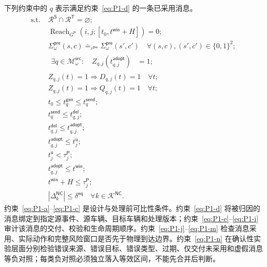 \documentclass[10pt,a4paper,twocolumn]{article}
\begin{document}
\addtocounter{equation}{-1}
下列约束中的 $q$ 表示满足约束~\eqref{eq:P1-d} 的一条已采用消息。
\begin{subequations}
\begin{align}
\mathrm{s.t.}\;&\mathcal R^{\mathsf S}\cap\mathcal R^{\mathsf T}=\varnothing;
\label{eq:P1-a}\\
&\operatorname{Reach}_{G^{\mathsf P}}\!(i,j;[t_0,t^{\mathsf{win}}+H])=0;
\label{eq:P1-b}\\
&\Sigma_{\omega}^{\mathsf{pre}}(s,c)\doteq_{\varepsilon^{\mathsf{pre}}}
\Sigma_{\omega}^{\mathsf{pre}}(s',c')
\quad\forall(s,c),(s',c')\in\{0,1\}^{2};
\label{eq:P1-c}\\
&\begin{aligned}
\exists q\in\mathcal M_{\omega}^{\mathsf{src}}:\quad
Z_{q,j}(t_{q,j}^{\mathsf{adopt}})&=1;
\end{aligned}
\label{eq:P1-d}\\
&Z_{q,j}(t)=1\Rightarrow D_{q,j}(t)=1\quad\forall t;
\label{eq:P1-e}\\
&Z_{q,j}(t)=1\Rightarrow Q_{q,j}(t)=1\quad\forall t;
\label{eq:P1-f}\\
&t_0\leq t_q^{\mathsf{gen}}\leq t_q^{\mathsf{send}};
\label{eq:P1-g}\\
&t_q^{\mathsf{send}}\leq t_{q,j}^{\mathsf{del}};
\label{eq:P1-h}\\
&t_{q,j}^{\mathsf{del}}\leq t_{q,j}^{\mathsf{adopt}};
\label{eq:P1-i}\\
&t_{q,j}^{\mathsf{adopt}}\leq t_j^{\mathsf u};
\label{eq:P1-j}\\
&t_j^{\mathsf u}<\tau_j^{\mathsf P};
\label{eq:P1-k}\\
&t_{q,j}^{\mathsf{adopt}}\leq t^{\mathsf{win}};
\label{eq:P1-l}\\
&t^{\mathsf{win}}+H\leq\tau_j^{\mathsf P};
\label{eq:P1-m}\\
&\left|\Delta_{k}^{\mathsf{NC}}\right|\leq\delta^{\mathsf{eq}}
\quad\forall k\in\mathcal K^{\mathsf{NC}}.
\label{eq:P1-n}
\end{align}
\end{subequations}
约束~\eqref{eq:P1-a}--\eqref{eq:P1-c} 是设计与处理前可比性条件。约束~\eqref{eq:P1-d} 将被归因的消息绑定到指定源事件、源车辆、目标车辆和处理版本；约束~\eqref{eq:P1-e}--\eqref{eq:P1-i} 审计该消息的交付、校验和生命周期顺序。约束~\eqref{eq:P1-j}--\eqref{eq:P1-m} 检查消息采用、实际动作和完整风险窗口是否先于物理到达边界。约束~\eqref{eq:P1-n} 在确认性实验层面分别检验错误来源、错误目标、错误类型、过期、仅交付未采用和虚假消息等负对照；每类负对照必须独立落入等效区间，不能先合并后判断。
\end{document}
